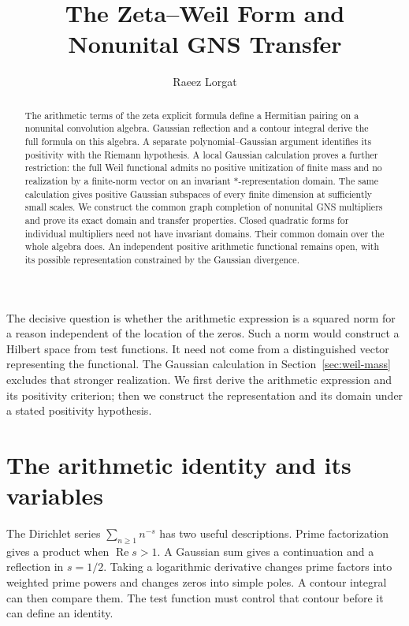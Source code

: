 \documentclass[11pt]{article}
\title{The Zeta--Weil Form and Nonunital GNS Transfer}
\author{Raeez Lorgat}
\date{}
\numberwithin{equation}{section}
\begin{document}
\maketitle
\begin{abstract}
The arithmetic terms of the zeta explicit formula define a Hermitian
pairing on a nonunital convolution algebra.  Gaussian reflection and a
contour integral derive the full formula on this algebra.  A separate
polynomial--Gaussian argument identifies its positivity with the Riemann
hypothesis.  A local Gaussian calculation proves a further
restriction: the full Weil functional admits no positive unitization of
finite mass and no realization by a finite-norm vector on an invariant
$*$-representation domain.  The same calculation gives positive Gaussian
subspaces of every finite dimension at sufficiently small scales.
We construct the common graph completion of
nonunital GNS multipliers and prove its exact domain and transfer
properties.  Closed quadratic forms for individual multipliers need not
have invariant domains.  Their common domain over the whole algebra does.
An independent positive arithmetic functional remains open, with its
possible representation constrained by the Gaussian divergence.
\end{abstract}

The decisive question is whether the arithmetic expression is a squared
norm for a reason independent of the location of the zeros.
Such a norm would construct a Hilbert space from test functions.
It need not come from a distinguished vector representing the functional.
The Gaussian calculation in Section~\ref{sec:weil-mass} excludes that
stronger realization.  We first derive the arithmetic expression and its
positivity criterion; then we construct the representation and its domain
under a stated positivity hypothesis.

\section{The arithmetic identity and its variables}

The Dirichlet series $\sum_{n\geq1}n^{-s}$ has two useful descriptions.
Prime factorization gives a product when $\operatorname{Re}s>1$.
A Gaussian sum gives a continuation and a reflection in $s=1/2$.
Taking a logarithmic derivative changes prime factors into weighted prime
powers and changes zeros into simple poles.  A contour integral can then
compare them.  The test function must control that contour before it can
define an identity.
\end{document}
